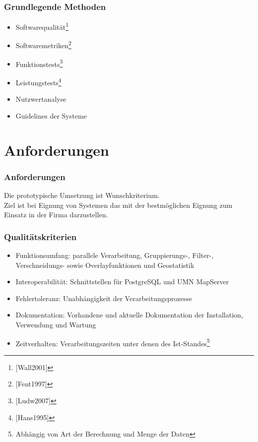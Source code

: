 \documentclass{beamer}
\begin{document}
\begin{frame}\frametitle{Grundlegende Methoden} 
\begin{itemize}
\item Softwarequalität\footnote{[Wall2001]} %
\item Softwaremetriken\footnote{[Fent1997]}
\item Funktionstests\footnote{[Ludw2007]}
\item Leistungstests\footnote{[Hans1995]}
\item Nutzwertanalyse
%
\item Guidelines der Systeme
\end{itemize}
\end{frame}

% 

\section{Anforderungen}
\begin{frame}\frametitle{Anforderungen}
Die prototypische Umsetzung ist Wunschkriterium.\\ %
Ziel ist bei Eignung von Systemen das mit der bestmöglichen Eignung zum Einsatz in der Firma darzustellen.
\end{frame}

\begin{frame}\frametitle{Qualitätskriterien}
\begin{itemize}
\item Funktionsumfang: parallele Verarbeitung, Gruppierungs-, Filter-, Verschneidungs- sowie Overlayfunktionen und Geostatistik
\item Interoperabilität: Schnittstellen für PostgreSQL und UMN MapServer
\item Fehlertoleranz: Unabhängigkeit der Verarbeitungsprozesse
\item Dokumentation: Vorhandene und aktuelle Dokumentation der Installation, Verwendung und Wartung
\item Zeitverhalten: Verarbeitungszeiten unter denen des Ist-Standes\footnote{Abhängig von Art der Berechnung und Menge der Daten}
\end{itemize}
\end{frame}
\end{document}
